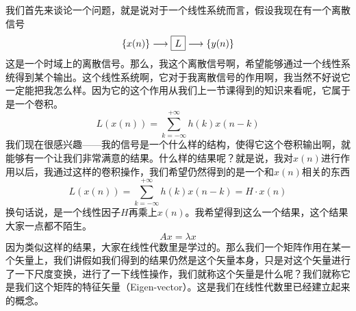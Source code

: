 \documentclass[a4paper,12pt]{article}
\begin{document}
我们首先来谈论一个问题，就是说对于一个线性系统而言，假设我现在有一个离散信号
\begin{equation}
    \left \{ x(n) \right \} \longrightarrow 
    \tikz[baseline=(Lbox.base)]{\node[draw=black, inner sep=4pt] (Lbox) {$L$};}
    \longrightarrow \left \{ y(n) \right \}
\end{equation}
这是一个时域上的离散信号。那么，我这个离散信号啊，希望能够通过一个线性系统得到某个输出。这个线性系统啊，它对于我离散信号的作用啊，我当然不好说它一定能把我怎么样。因为它的这个作用从我们上一节课得到的知识来看呢，它属于是一个卷积。
\begin{equation}
   L\left ( x(n) \right ) = \sum_{k=-\infty}^{+\infty}h(k)x(n-k) 
\end{equation}
我们现在很感兴趣——我的信号是一个什么样的结构，使得它这个卷积输出啊，就能够有一个让我们非常满意的结果。什么样的结果呢？就是说，我对$x(n)$进行作用以后，我通过这样的卷积操作，我们希望仍然得到的是一个和$x(n)$相关的东西
\begin{equation}
   L\left ( x(n) \right ) = \sum_{k=-\infty}^{+\infty}h(k)x(n-k) = H\cdot x(n)
\end{equation}
换句话说，是一个线性因子$H$再乘上$x(n)$。我希望得到这么一个结果，这个结果大家一点都不陌生。
\begin{equation}
   Ax = \lambda x
\end{equation}
因为类似这样的结果，大家在线性代数里是学过的。那么我们一个矩阵作用在某一个矢量上，我们讲假如我们得到的结果仍然是这个矢量本身，只是对这个矢量进行了一下尺度变换，进行了一下线性操作，我们就称这个矢量是什么呢？我们就称它是我们这个矩阵的特征矢量（Eigen-vector）。这是我们在线性代数里已经建立起来的概念。
\end{document}
